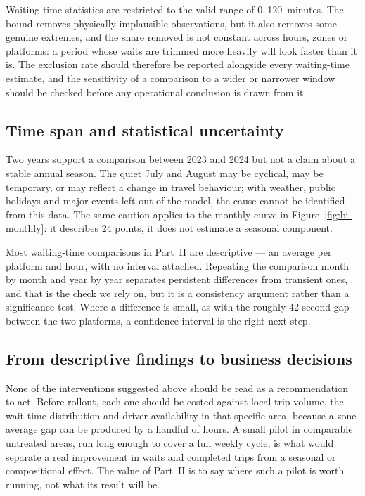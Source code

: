 \documentclass[11pt,a4paper]{article}
\begin{document}
Waiting-time statistics are restricted to the valid range of 0--120~minutes. The bound
removes physically implausible observations, but it also removes some genuine extremes,
and the share removed is not constant across hours, zones or platforms: a period whose
waits are trimmed more heavily will look faster than it is. The exclusion rate should
therefore be reported alongside every waiting-time estimate, and the sensitivity of a
comparison to a wider or narrower window should be checked before any operational
conclusion is drawn from it.

\subsection{Time span and statistical uncertainty}

Two years support a comparison between 2023 and 2024 but not a claim about a stable
annual season. The quiet July and August may be cyclical, may be temporary, or may
reflect a change in travel behaviour; with weather, public holidays and major events
left out of the model, the cause cannot be identified from this data. The same caution
applies to the monthly curve in Figure~\ref{fig:bi-monthly}: it describes 24 points, it
does not estimate a seasonal component.

Most waiting-time comparisons in Part~II are descriptive --- an average per platform and
hour, with no interval attached. Repeating the comparison month by month and year by
year separates persistent differences from transient ones, and that is the check we rely
on, but it is a consistency argument rather than a significance test. Where a difference
is small, as with the roughly 42-second gap between the two platforms, a confidence
interval is the right next step.

\subsection{From descriptive findings to business decisions}

None of the interventions suggested above should be read as a recommendation to act.
Before rollout, each one should be costed against local trip volume, the wait-time
distribution and driver availability in that specific area, because a zone-average gap
can be produced by a handful of hours. A small pilot in comparable untreated areas, run
long enough to cover a full weekly cycle, is what would separate a real improvement in
waits and completed trips from a seasonal or compositional effect. The value of Part~II
is to say where such a pilot is worth running, not what its result will be.
\end{document}
